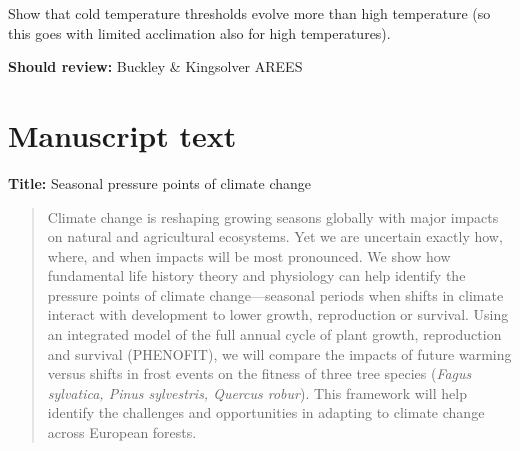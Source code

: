 \documentclass[11pt,letter]{article}
\begin{document}
\citet{Bennett2021} Show that cold temperature thresholds evolve more than high temperature (so this goes with limited acclimation also for high temperatures). 

{\bf Should review:} Buckley \& Kingsolver AREES

\newpage
\section{Manuscript text} 

{\bf Title:} Seasonal pressure points of climate change

\begin{abstract}
Climate change is reshaping growing seasons globally with major impacts on natural and agricultural ecosystems. Yet we are uncertain exactly how, where, and when impacts will be most pronounced. We show how fundamental life history theory and physiology can help identify the pressure points of climate change---seasonal periods when shifts in climate interact with development to lower growth, reproduction or survival. Using an integrated model of the full annual cycle of plant growth, reproduction and survival (PHENOFIT), we will compare the impacts of future warming versus shifts in frost events on the fitness of three tree species (\emph{Fagus sylvatica, Pinus sylvestris, Quercus robur}). This framework will help identify the challenges and opportunities in adapting to climate change across European forests. 
\end{abstract}
\end{document}
